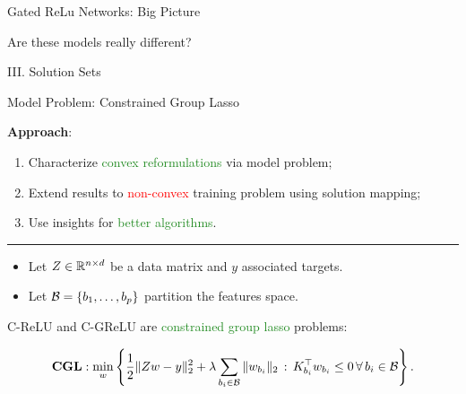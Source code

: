 \documentclass[usenames,dvipsnames,mathserif,notheorems]{beamer}
\newcommand{\horizontalrule}{
	{
			\vspace{-0.5em}
			\center \rule{\textwidth}{0.1em}
			\vspace{-0.2em}
		}
}
\newcommand{\red}[1]{\textcolor{Red}{#1}}
\newcommand{\green}[1]{\textcolor{ForestGreen}{#1}}
\begin{document}
\begin{frame}{Gated ReLu Networks: Big Picture}
	\begin{center}
		\Large Are these models really different?
	\end{center}

	\pause

	\begin{figure}[]
		\centering
		
	\end{figure}
\end{frame}


\begin{frame}{}
	\begin{center}
		\huge III. Solution Sets
	\end{center}
\end{frame}

\begin{frame}{Model Problem: Constrained Group Lasso}

	{
		\large
		\textbf{Approach}:
		\begin{enumerate}
			\item \pause
			      Characterize \green{convex reformulations} via model problem;
			\item \pause
			      Extend results to \red{non-convex} training problem
			      using solution mapping;
			\item \pause
			      Use insights for \green{better algorithms}.
		\end{enumerate}
	}

	\pause
	\horizontalrule

	\begin{itemize}
		\item Let \( Z \in \mathbb{R}^{n \times d} \) be a data matrix and \( y \) associated targets.
		      \pause
		\item Let \( \mathcal{B} = \left\{b_1, \ldots, b_p\right\} \) partition the
		      features space.
		      \pause
	\end{itemize}

	\vspace{2ex}

	C-ReLU and C-GReLU are \green{constrained group lasso} problems:

	\begin{equation*}
		\textbf{CGL}: \min_{w}
		\left\{ \frac 1 2 \|Z w - y\|_2^2
			+ \lambda \sum_{{b_i} \in \mathcal{B}} \|w_{b_i}\|_2
			\, : \, K_{{b_i}}^\top w_{b_i} \leq 0 \, \forall \, {b_i} \in \mathcal{B}\right\}.
	\end{equation*}

\end{frame}
\end{document}
